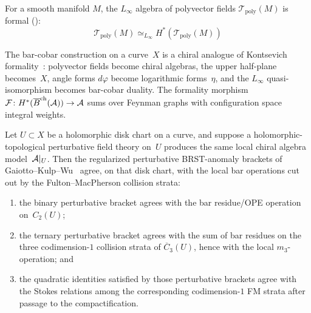 \begin{theorem}
\label{thm:kontsevich-formality-feynman}
For a smooth manifold $M$, the $L_\infty$ algebra of polyvector fields
$\mathcal{T}_{\text{poly}}(M)$ is formal (\cite{Kontsevich03}):
\[\mathcal{T}_{\text{poly}}(M) \simeq_{L_\infty} H^*(\mathcal{T}_{\text{poly}}(M))\]
\end{theorem}

\begin{remark}
\label{rem:kontsevich-graphs}
\label{sec:connections-other-feynman}
The bar-cobar construction on a curve~$X$ is a chiral analogue of
Kontsevich formality~\cite{Kon99}: polyvector fields become chiral
algebras, the upper half-plane becomes~$X$, angle forms $d\varphi$
become logarithmic forms~$\eta$, and the $L_\infty$
quasi-isomorphism becomes bar-cobar duality.  The formality morphism
$\mathcal{F}\colon H^*(\overline{B}^{\mathrm{ch}}(\mathcal{A})) \to \mathcal{A}$ sums over
Feynman graphs with configuration space integral weights.
\end{remark}

\begin{conjecture}\label{conj:disk-local-perturbative-fm}
Let $U \subset X$ be a holomorphic disk chart on a curve, and suppose a
holomorphic-topological perturbative field theory on~$U$ produces the
same local chiral algebra model~$\mathcal{A}|_U$.
Then the regularized perturbative BRST-anomaly brackets of
Gaiotto--Kulp--Wu~\cite{GKW24} agree, on that disk chart, with the
local bar operations cut out by the Fulton--MacPherson collision
strata:
\begin{enumerate}[label=\textup{(\roman*)}]
\item the binary perturbative bracket agrees with the bar residue/OPE
  operation on~$C_2(U)$;
\item the ternary perturbative bracket agrees with the sum of bar
  residues on the three codimension-$1$ collision strata of
  $\overline{C}_3(U)$, hence with the local $m_3$-operation; and
\item the quadratic identities satisfied by those perturbative brackets
  agree with the Stokes relations among the corresponding
  codimension-$1$ FM strata after passage to the compactification.
\end{enumerate}
\end{conjecture}

